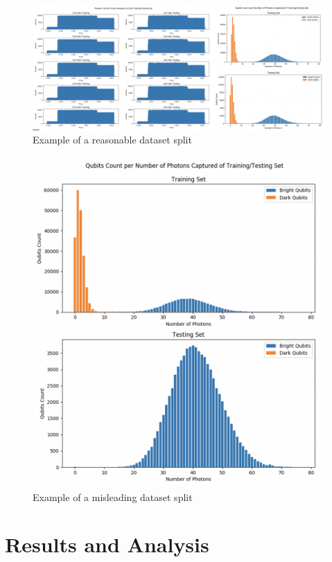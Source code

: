 \documentclass[letterpaper,twocolumn,10pt]{article}
\begin{document}
\begin{figure}[]
    \includegraphics[width=2\columnwidth]{Figures/datasplit_good.png}
    \centering
    \caption{Example of a reasonable dataset split}
    \label{fig:datasplit_good}
\end{figure}

\begin{figure}[]
    \includegraphics[width=\linewidth]{Figures/datasplit_bad.png}
    \centering
    \caption{Example of a misleading dataset split}
    \label{fig:datasplit_bad}
\end{figure}

\section{Results and Analysis}
\end{document}
